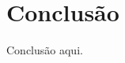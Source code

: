 \documentclass[9pt, a4paper, nofonttune, journal]{IEEEtran}
\begin{document}
\section{Conclusão}
Conclusão aqui.




% 
% 
% 
% 
% 
% 
% 
% 
% 
% 
% 
% 
\end{document}
